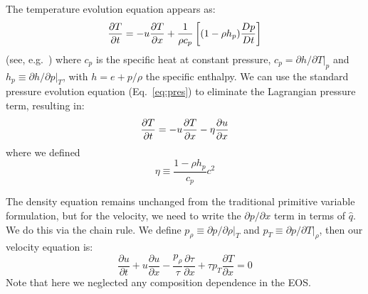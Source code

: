 The temperature evolution equation appears as:
\begin{equation}
\frac{\partial T}{\partial t} = -u{\frac{{\partial T}}{\partial x}} +
  \frac{1}{\rho c_p} \left [ (1 - \rho h_p) \frac{Dp}{Dt} \right ]
\end{equation}
(see, e.g.\ \cite{ABRZ:I}) where $c_p$ is the specific heat at
constant pressure, $c_p = \partial h/\partial T|_p$ and $h_p \equiv
\partial h / \partial p |_T$, with $h = e + p/\rho$ the specific
enthalpy.  We can use the standard pressure evolution equation
(Eq.~\ref{eq:pres}) to eliminate the Lagrangian pressure term,
resulting in:
\begin{equation}
\frac{\partial T}{\partial t} = -u{\frac{{\partial T}}{\partial x}} - \eta {\frac{{\partial u}}{\partial x}}
\end{equation}
where we defined
\begin{equation}
\eta \equiv \frac{1 - \rho h_p}{c_p} c^2
\end{equation}

The density equation remains unchanged from the traditional primitive
variable formulation, but for the velocity, we need to write the
$\partial p/\partial x$ term in terms of $\hat{q}$.  We do this via
the chain rule.  We define $p_\rho \equiv {\partial p}/{\partial \rho}
|_T$ and $p_T \equiv {\partial p}/{\partial T} |_\rho$, then our
velocity equation is:
\begin{equation}
\frac{\partial u}{\partial t} + u \frac{\partial u}{\partial x} - \frac{p_\rho}{\tau} \frac{\partial \tau}{\partial x} + {\tau p_T} \frac{\partial T}{\partial x} = 0
\end{equation}
Note that here we neglected any composition dependence in the EOS.

